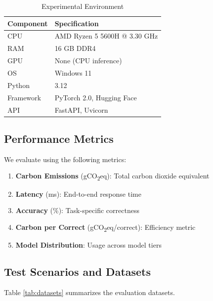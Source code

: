 \documentclass[conference]{IEEEtran}
\newcommand{\gco}{gCO\textsubscript{2}eq}
\begin{document}
\begin{table}[h]
\centering
\caption{Experimental Environment}
\label{tab:environment}
\begin{tabular}{ll}
\toprule
\textbf{Component} & \textbf{Specification} \\
\midrule
CPU & AMD Ryzen 5 5600H @ 3.30 GHz \\
RAM & 16 GB DDR4 \\
GPU & None (CPU inference) \\
OS & Windows 11 \\
Python & 3.12 \\
Framework & PyTorch 2.0, Hugging Face \\
API & FastAPI, Uvicorn \\
\bottomrule
\end{tabular}
\end{table}

\subsection{Performance Metrics}

We evaluate using the following metrics:

\begin{enumerate}
    \item \textbf{Carbon Emissions} (\gco{}): Total carbon dioxide equivalent
    \item \textbf{Latency} (ms): End-to-end response time
    \item \textbf{Accuracy} (\%): Task-specific correctness
    \item \textbf{Carbon per Correct} (\gco{}/correct): Efficiency metric
    \item \textbf{Model Distribution}: Usage across model tiers
\end{enumerate}

\subsection{Test Scenarios and Datasets}

Table \ref{tab:datasets} summarizes the evaluation datasets.
\end{document}
